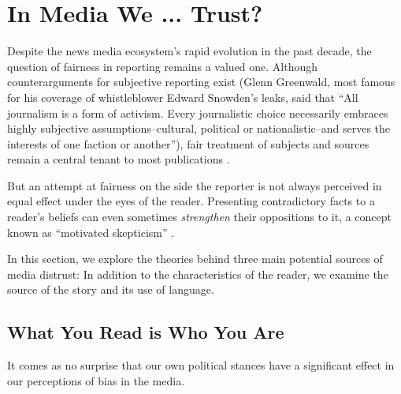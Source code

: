 \chapter{In Media We ... Trust?}

Despite the news media ecosystem's rapid evolution in the past decade, the question of fairness in reporting remains a valued one. Although counterarguments for subjective reporting exist (Glenn Greenwald, most famous for his coverage of whistleblower Edward Snowden's leaks, said that ``All journalism is a form of activism. Every journalistic choice necessarily embraces highly subjective assumptions--cultural, political or nationalistic--and serves the interests of one faction or another''), fair treatment of subjects and sources remain a central tenant to most publications \cite{Greenwald}. 
  
But an attempt at fairness on the side the reporter is not always perceived in equal effect under the eyes of the reader. Presenting contradictory facts to a reader's beliefs can even sometimes \emph{strengthen} their oppositions to it, a concept known as ``motivated skepticism'' \cite{taber2006motivated}.

In this section, we explore the theories behind three main potential sources of media distrust: In addition to the characteristics of the reader, we examine the source of the story and its use of language.



 
 


 
 
 
 

\section{What You Read is Who You Are}

It comes as no surprise that our own political stances have a significant effect in our perceptions of bias in the media. 

